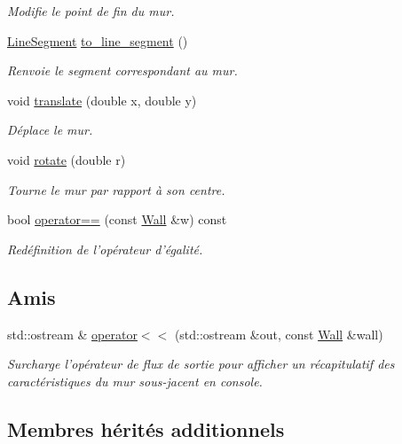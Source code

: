 \begin{DoxyCompactItemize}
\begin{DoxyCompactList}\small\item\em Modifie le point de fin du mur. \end{DoxyCompactList}\item 
\hyperlink{classLineSegment}{Line\+Segment} \hyperlink{classWall_acb8c8b99d772ce94bf8ef4b249c32fd2}{to\+\_\+line\+\_\+segment} ()
\begin{DoxyCompactList}\small\item\em Renvoie le segment correspondant au mur. \end{DoxyCompactList}\item 
void \hyperlink{classWall_ab9f0416a2272041583bb261345963eed}{translate} (double x, double y)
\begin{DoxyCompactList}\small\item\em Déplace le mur. \end{DoxyCompactList}\item 
void \hyperlink{classWall_ab9ae9b0409c9b88c0d4b156c4e5ee5f5}{rotate} (double r)
\begin{DoxyCompactList}\small\item\em Tourne le mur par rapport à son centre. \end{DoxyCompactList}\item 
bool \hyperlink{classWall_adae0f86f9cef482e5f937fffdd17711d}{operator==} (const \hyperlink{classWall}{Wall} \&w) const 
\begin{DoxyCompactList}\small\item\em Redéfinition de l'opérateur d'égalité. \end{DoxyCompactList}\end{DoxyCompactItemize}
\subsection*{Amis}
\begin{DoxyCompactItemize}
\item 
std\+::ostream \& \hyperlink{classWall_a971cae1df191c5ccfd2ef1f6454a6d11}{operator$<$$<$} (std\+::ostream \&out, const \hyperlink{classWall}{Wall} \&wall)
\begin{DoxyCompactList}\small\item\em Surcharge l'opérateur de flux de sortie pour afficher un récapitulatif des caractéristiques du mur sous-\/jacent en console. \end{DoxyCompactList}\end{DoxyCompactItemize}
\subsection*{Membres hérités additionnels}


